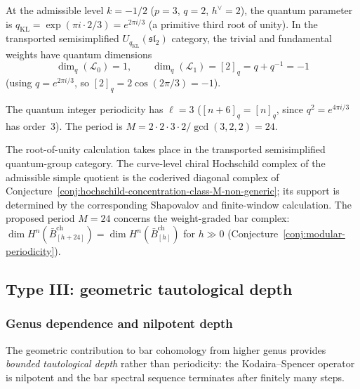 \begin{example}[Quantum periodicity for
\texorpdfstring{$\widehat{\mathfrak{sl}}_2$}{sl-hat_2} at \texorpdfstring{$k = -1/2$}{k = -1/2}]
\label{ex:hh-sl2-admissible}
At the admissible level $k = -1/2$ ($p = 3$, $q = 2$,
$h^\vee = 2$), the quantum parameter is
$q_{\mathrm{KL}} = \exp(\pi i \cdot 2/3) = e^{2\pi i/3}$
(a primitive third root of unity). In the transported semisimplified
$U_{q_{\mathrm{KL}}}(\mathfrak{sl}_2)$ category, the trivial and
fundamental weights have quantum dimensions
\[
\dim_q(\mathcal{L}_0) = 1, \qquad
\dim_q(\mathcal{L}_1) = [2]_q = q + q^{-1} = -1
\]
(using $q = e^{2\pi i/3}$, so $[2]_q = 2\cos(2\pi/3) = -1$).

The quantum integer periodicity has $\ell = 3$
($[n+6]_q = [n]_q$, since $q^2 = e^{4\pi i/3}$ has order~$3$).
The period is $M = 2 \cdot 2 \cdot 3 \cdot 2 / \gcd(3,2,2) = 24$.

The root-of-unity calculation takes place in the transported
semisimplified quantum-group category.  The curve-level chiral
Hochschild complex of the admissible simple quotient is the coderived
diagonal complex of
Conjecture~\ref{conj:hochschild-concentration-class-M-non-generic};
its support is determined by the corresponding Shapovalov and
finite-window calculation.  The proposed period $M=24$ concerns the
weight-graded bar complex:
$\dim H^n(\bar{B}^{\mathrm{ch}}_{[h+24]}) = \dim H^n(\bar{B}^{\mathrm{ch}}_{[h]})$
for $h \gg 0$ (Conjecture~\ref{conj:modular-periodicity}).
\end{example}

\subsection{Type III: geometric tautological depth}

\subsubsection{Genus dependence and nilpotent depth}

The geometric contribution to bar cohomology from higher genus provides \emph{bounded tautological depth} rather than periodicity: the Kodaira--Spencer operator is nilpotent and the bar spectral sequence terminates after finitely many steps.

